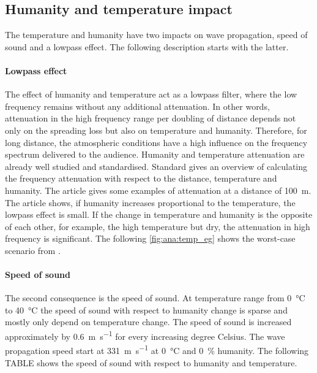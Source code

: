 

\subsection{Humanity and temperature impact}\label{sec:ana:hu_temp}
The temperature and humanity have two impacts on wave propagation, speed of sound and a lowpass effect. The following description starts with the latter. 

\paragraph{Lowpass effect} The effect of humanity and temperature act as a lowpass filter, where the low frequency remains without any additional attenuation. In other words, attenuation in the high frequency range per doubling of distance depends not only on the spreading loss but also on temperature and humanity. Therefore, for long distance, the atmospheric conditions have a high influence on the frequency spectrum delivered to the audience. Humanity and temperature attenuation are already well studied and standardised. Standard \citep{iso_9613-1} gives an overview of calculating the frequency attenuation with respect to the distance, temperature and humanity. The article \citep{corteel2017large} gives some examples of attenuation at a distance of \SI{100}{\meter}. The article shows, if humanity increases proportional to the temperature, the lowpass effect is small. If the change in temperature and humanity is the opposite of each other, for example, the high temperature but dry, the attenuation in high frequency is significant. The following \autoref{fig:ana:temp_eg} shows the worst-case scenario from \citep{corteel2017large}.

 

\paragraph{Speed of sound} The second consequence is the speed of sound. At temperature range from \SI{0}{\celsius} to \SI{40}{\celsius} the speed of sound with respect to humanity change is sparse and mostly only depend on temperature change. The speed of sound is increased approximately by \SI{0.6}{\meter\per\second} for every increasing degree Celsius. The wave propagation speed start at \SI{331}{\meter\per\second} at \SI{0}{\celsius} and \SI{0}{\percent} humanity. The following TABLE shows the speed of sound with respect to humanity and temperature. 


